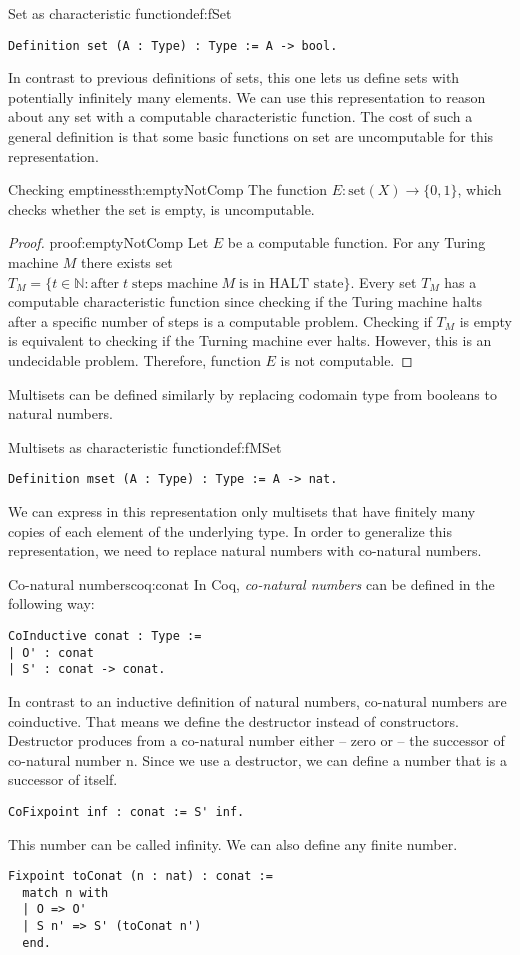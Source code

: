 \begin{defi}{Set as characteristic function}{def:fSet}
\begin{verbatim}
Definition set (A : Type) : Type := A -> bool.
\end{verbatim}
\end{defi}
In contrast to previous definitions of sets, this one lets us define sets with potentially infinitely many elements. We can use this representation to reason about any set with a computable characteristic function. The cost of such a general definition is that some basic functions on set are uncomputable for this representation.
\begin{theo}{Checking emptiness}{th:emptyNotComp}
The function $E : \textrm{set}(X) \rightarrow \{0, 1\}$, which checks whether the set is empty, is uncomputable.
\end{theo}
\begin{proof}{}{proof:emptyNotComp}
Let $E$ be a computable function. For any Turing machine $M$ there exists set $T_M = \{t \in \mathbb{N} : \textrm{after} \; t \; \textrm{steps machine} \; M \; \textrm{is in HALT state}\}$. Every set $T_M$ has a computable characteristic function since checking if the Turing machine halts after a specific number of steps is a computable problem. Checking if $T_M$ is empty is equivalent to checking if the Turning machine ever halts. However, this is an undecidable problem. Therefore, function $E$ is not computable. \phantom{dasd} \contradiction
\end{proof}
Multisets can be defined similarly by replacing codomain type from booleans to natural numbers.
\begin{defi}{Multisets as characteristic function}{def:fMSet}
\begin{verbatim}
Definition mset (A : Type) : Type := A -> nat.
\end{verbatim}
\end{defi}
We can express in this representation only multisets that have finitely many copies of each element of the underlying type. In order to generalize this representation, we need to replace natural numbers with co-natural numbers.
\begin{coq}{Co-natural numbers}{coq:conat}
In Coq, \emph{co-natural numbers} can be defined in the following way:
\begin{verbatim}
CoInductive conat : Type := 
| O' : conat
| S' : conat -> conat.
\end{verbatim}
In contrast to an inductive definition of natural numbers, co-natural numbers are coinductive. That means we define the destructor instead of constructors. Destructor produces from a co-natural number either  -- zero or  -- the successor of co-natural number n. Since we use a destructor, we can define a number that is a successor of itself.
\begin{verbatim}
CoFixpoint inf : conat := S' inf.
\end{verbatim}
This number can be called infinity. We can also define any finite number.
\begin{verbatim}
Fixpoint toConat (n : nat) : conat :=
  match n with
  | O => O'
  | S n' => S' (toConat n') 
  end.
\end{verbatim}
\end{coq}
